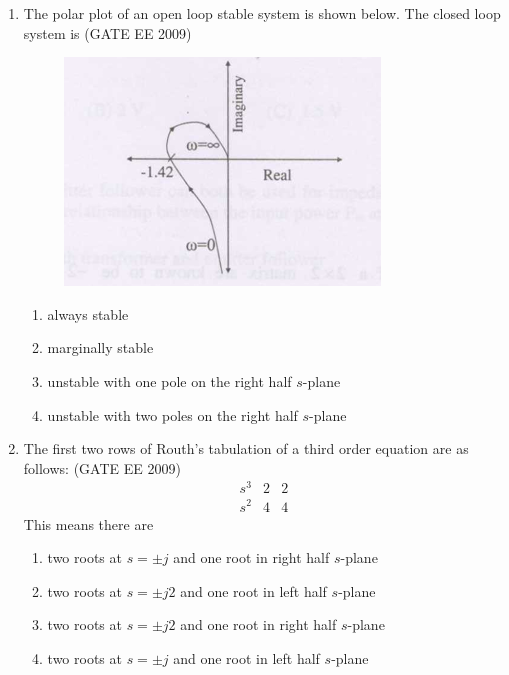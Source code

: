 \documentclass[journal,12pt,onecolumn]{IEEEtran}
\theoremstyle{remark}
\begin{document}
\begin{flushleft}
\begin{enumerate}
\item The polar plot of an open loop stable system is shown below. The closed loop system is
\hfill(GATE EE 2009)
\begin{figure}[h!]
    \centering
    \includegraphics[width=0.5\columnwidth]{figs/Screenshot 2025-08-08 192713.png}
    \caption{}
    \label{fig:placeholder}
\end{figure}

\begin{enumerate}
    \item always stable
    \item marginally stable
    \item unstable with one pole on the right half $s$-plane
    \item unstable with two poles on the right half $s$-plane
\end{enumerate}


\item The first two rows of Routh's tabulation of a third order equation are as follows:
\hfill(GATE EE 2009)
\[
\begin{array}{ccc}
s^3 & 2 & 2 \\
s^2 & 4 & 4
\end{array}
\]
This means there are
\begin{enumerate}
    \item  two roots at $s = \pm j$ and one root in right half $s$-plane
    \item two roots at $s = \pm j2$ and one root in left half $s$-plane
      \item two roots at $s = \pm j2$ and one root in right half $s$-plane
     \item  two roots at $s = \pm j$ and one root in left half $s$-plane
\end{enumerate}




\end{enumerate}
\end{flushleft}
\end{document}
